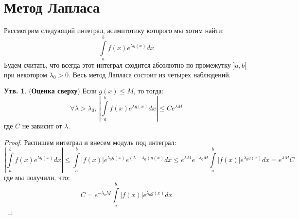 \documentclass[12pt]{article}
\theoremstyle{definition}
\newtheorem{prop}{Утв.}
\newcommand{\ddint}[2]{\displaystyle\int\limits_{#1}^{#2}}
\begin{document}
\newpage
\section*{Метод Лапласа}
Рассмотрим следующий интеграл, асимптотику которого мы хотим найти:
$$
	\ddint{a}{b}f(x)e^{\lambda g(x)}dx
$$
Будем считать, что всегда этот интеграл сходится абсолютно по промежутку $]a,b[$ при некотором $\lambda_0 > 0$. Весь метод Лапласа состоит из четырех наблюдений.

\begin{prop}(\textbf{Оценка сверху})
	Если $g(x) \leq M$, то тогда:
	$$
		\forall \lambda > \lambda_0, \, \left|\ddint{a}{b}f(x)e^{\lambda g(x)}dx \right| \leq C e^{\lambda M}
	$$
	где $C$ не зависит от $\lambda$.
\end{prop}
\begin{proof}
	Распишем интеграл и внесем модуль под интеграл:
	$$
		\left|\ddint{a}{b}f(x)e^{\lambda g(x)}dx \right| \leq  \ddint{a}{b}|f(x)|e^{\lambda_0 g(x)}e^{(\lambda - \lambda_0)g(x)}dx \leq e^{\lambda M}e^{-\lambda_0 M}\ddint{a}{b}|f(x)|e^{\lambda_0 g(x)}dx = e^{\lambda M}C
	$$
	где мы получили, что:
	$$
		C = e^{-\lambda_0 M}\ddint{a}{b}|f(x)|e^{\lambda_0 g(x)}dx
	$$
\end{proof}
\end{document}
